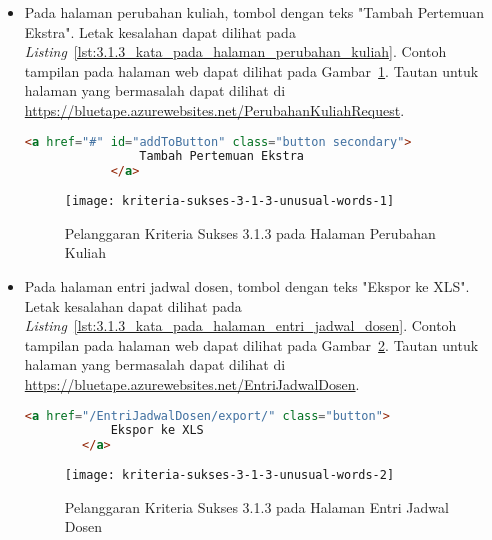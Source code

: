 \begin{itemize}
    \item Pada halaman perubahan kuliah, tombol dengan teks "Tambah Pertemuan Ekstra". Letak kesalahan dapat dilihat pada \mbox{\textit{Listing} \ref{lst:3.1.3_kata_pada_halaman_perubahan_kuliah}}. Contoh tampilan pada halaman web dapat dilihat pada \mbox{Gambar \ref{fig:3.1.3_unusual_words_1}}. Tautan untuk halaman yang bermasalah dapat dilihat di \url{https://bluetape.azurewebsites.net/PerubahanKuliahRequest}.
    \begin{lstlisting}[frame=single, label={lst:3.1.3_kata_pada_halaman_perubahan_kuliah}, language=HTML, caption=Pelanggaran Kriteria Sukses 3.1.3 pada Halaman Perubahan Kuliah]
            <a href="#" id="addToButton" class="button secondary">
                Tambah Pertemuan Ekstra
            </a>
    \end{lstlisting}
    
    \begin{figure}[H]
        \centering  
        \texttt{[image: kriteria-sukses-3-1-3-unusual-words-1]}  
        \caption[Pelanggaran Kriteria Sukses 3.1.3 pada Halaman Perubahan Kuliah]{Pelanggaran Kriteria Sukses 3.1.3 pada Halaman Perubahan Kuliah}
        \label{fig:3.1.3_unusual_words_1}  
    \end{figure}
    
    \item Pada halaman entri jadwal dosen, tombol dengan teks "Ekspor ke XLS". Letak kesalahan dapat dilihat pada \mbox{\textit{Listing} \ref{lst:3.1.3_kata_pada_halaman_entri_jadwal_dosen}}. Contoh tampilan pada halaman web dapat dilihat pada \mbox{Gambar \ref{fig:3.1.3_unusual_words_2}}. Tautan untuk halaman yang bermasalah dapat dilihat di \url{https://bluetape.azurewebsites.net/EntriJadwalDosen}.
    \begin{lstlisting}[frame=single, label={lst:3.1.3_kata_pada_halaman_entri_jadwal_dosen}, language=HTML, caption=Pelanggaran Kriteria Sukses 3.1.3 pada Halaman Entri Jadwal Dosen]
        <a href="/EntriJadwalDosen/export/" class="button">
            Ekspor ke XLS
        </a>
    \end{lstlisting}
    
    \begin{figure}[H]
        \centering  
        \texttt{[image: kriteria-sukses-3-1-3-unusual-words-2]}  
        \caption[Pelanggaran Kriteria Sukses 3.1.3 pada Halaman Entri Jadwal Dosen]{Pelanggaran Kriteria Sukses 3.1.3 pada Halaman Entri Jadwal Dosen}
        \label{fig:3.1.3_unusual_words_2}  
    \end{figure}


\end{itemize}
